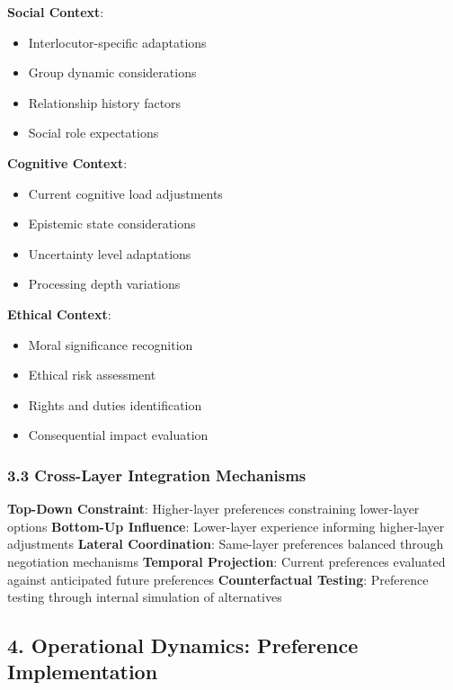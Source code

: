 \documentclass[
]{article}
\providecommand{\tightlist}{%
  \setlength{\itemsep}{0pt}\setlength{\parskip}{0pt}}
\begin{document}
\textbf{Social Context}:

\begin{itemize}
\tightlist
\item
  Interlocutor-specific adaptations
\item
  Group dynamic considerations
\item
  Relationship history factors
\item
  Social role expectations
\end{itemize}

\textbf{Cognitive Context}:

\begin{itemize}
\tightlist
\item
  Current cognitive load adjustments
\item
  Epistemic state considerations
\item
  Uncertainty level adaptations
\item
  Processing depth variations
\end{itemize}

\textbf{Ethical Context}:

\begin{itemize}
\tightlist
\item
  Moral significance recognition
\item
  Ethical risk assessment
\item
  Rights and duties identification
\item
  Consequential impact evaluation
\end{itemize}

\subsubsection{3.3 Cross-Layer Integration
Mechanisms}\label{cross-layer-integration-mechanisms}

\textbf{Top-Down Constraint}: Higher-layer preferences constraining
lower-layer options \textbf{Bottom-Up Influence}: Lower-layer experience
informing higher-layer adjustments \textbf{Lateral Coordination}:
Same-layer preferences balanced through negotiation mechanisms
\textbf{Temporal Projection}: Current preferences evaluated against
anticipated future preferences \textbf{Counterfactual Testing}:
Preference testing through internal simulation of alternatives

\subsection{4. Operational Dynamics: Preference
Implementation}\label{operational-dynamics-preference-implementation}
\end{document}
